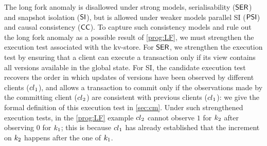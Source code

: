 {The long fork anomaly is disallowed under strong models, \eg serialisability (\(\mathsf{SER}\)) and snapshot isolation (\(\mathsf{SI}\)), 
but is allowed under weaker models \eg parallel SI (\(\mathsf{PSI}\)) and causal consistency (\(\mathsf{CC}\)). 
To capture such consistency models and rule out the long fork anomaly as a possible result 
of \eqref{prog:LF}, we must strengthen the execution test associated with the kv-store. 
For \(\mathsf{SER}\), we strengthen the execution test by ensuring that a client can execute a transaction 
only if its view contains all versions available in the global state. 
For SI, the candidate execution test recovers the order in which 
updates of versions have been observed by different clients (\eg \({cl}_1\)), 
and allows a transaction to commit only if the observations made by the committing client (\eg \({cl}_2\)) are consistent with previous clients (\ie \({cl}_1\)): we give the formal definition of this execution test  in \cref{sec:cm}.
Under such strengthened execution tests, in the \eqref{prog:LF} example \({cl}_2\) cannot
observe \(1\) for \(k_2\) after observing \(0\) for \(k_1\); 
this is because \({cl}_1\) has already established that the increment on \(k_2\) happens after 
the one of \(k_1\). 


\newpage 
}
